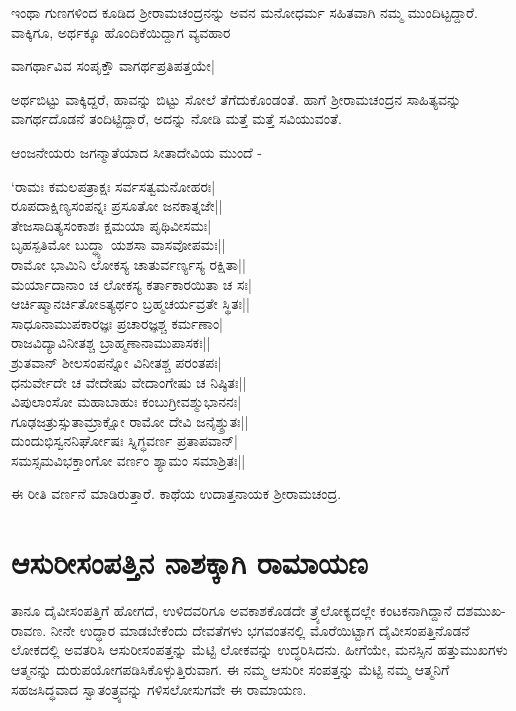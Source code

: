 ಇಂಥಾ ಗುಣಗಳಿಂದ ಕೂಡಿದ ಶ್ರೀರಾಮಚಂದ್ರನನ್ನು ಅವನ ಮನೋಧರ್ಮ ಸಹಿತವಾಗಿ ನಮ್ಮ ಮುಂದಿಟ್ಟದ್ದಾರೆ. ವಾಕ್ಕಿಗೂ, ಅರ್ಥಕ್ಕೂ ಹೊಂದಿಕೆಯಿದ್ದಾಗ ವ್ಯವಹಾರ 

\begin{shloka}
ವಾಗರ್ಥಾವಿವ ಸಂಪೃಕ್ತೌ ವಾಗರ್ಥಪ್ರತಿಪತ್ತಯೇ|\label{223a}
\end{shloka}
ಅರ್ಥಬಿಟ್ಟು ವಾಕ್ಕಿದ್ದರೆ, ಹಾವನ್ನು ಬಿಟ್ಟು ಸೋಲೆ ತೆಗೆದುಕೊಂಡಂತೆ. ಹಾಗೆ ಶ್ರೀರಾಮಚಂದ್ರನ ಸಾಹಿತ್ಯವನ್ನು ವಾಗರ್ಥದೊಡನೆ ತಂದಿಟ್ಟಿದ್ದಾರೆ, ಅದನ್ನು ನೋಡಿ ಮತ್ತೆ ಮತ್ತೆ ಸವಿಯುವಂತೆ.

ಆಂಜನೇಯರು ಜಗನ್ಮಾತೆಯಾದ ಸೀತಾದೇವಿಯ ಮುಂದೆ -

\begin{shloka}
`ರಾಮಃ ಕಮಲಪತ್ರಾಕ್ಷಃ ಸರ್ವಸತ್ವಮನೋಹರಃ|\\
ರೂಪದಾಕ್ಷಿಣ್ಯಸಂಪನ್ನಃ ಪ್ರಸೂತೋ ಜನಕಾತ್ನಜೇ||\\
ತೇಜಸಾದಿತ್ಯಸಂಕಾಶಃ ಕ್ಷಮಯಾ ಪೃಥಿವೀಸಮಃ|\\
ಬೃಹಸ್ಪತಿಮೋ ಬುದ್ಧ್ಯಾ ಯಶಸಾ ವಾಸವೋಪಮಃ||\\
ರಾಮೋ ಭಾಮಿನಿ ಲೋಕಸ್ಯ ಚಾತುರ್ವರ್ಣ್ಯಸ್ಯ ರಕ್ಷಿತಾ||\\
ಮರ್ಯಾದಾನಾಂ ಚ ಲೋಕಸ್ಯ ಕರ್ತಾಕಾರಯಿತಾ ಚ ಸಃ|\\
ಆರ್ಚಿಷ್ಮಾನರ್ಚಿತೋಽತ್ಯರ್ಥಂ ಬ್ರಹ್ಮಚರ್ಯವ್ರತೇ ಸ್ಥಿತಃ||\\
ಸಾಧೂನಾಮುಪಕಾರಜ್ಞಃ ಪ್ರಚಾರಜ್ಞಶ್ಚ ಕರ್ಮಣಾಂ|\\
ರಾಜವಿದ್ಯಾವಿನೀತಶ್ಚ ಬ್ರಾಹ್ಮಣಾನಾಮುಪಾಸಕಃ||\\
ಶ್ರುತವಾನ್ ಶೀಲಸಂಪನ್ನೋ ವಿನೀತಶ್ಚ ಪರಂತಪಃ|\\
ಧನುರ್ವೇದೇ ಚ ವೇದೇಷು ವೇದಾಂಗೇಷು ಚ ನಿಷ್ಠಿತಃ||\\
ವಿಪುಲಾಂಸೋ ಮಹಾಬಾಹುಃ ಕಂಬುಗ್ರೀವಶ್ಮುಭಾನನಃ|\\
ಗೂಢಜತ್ರುಸ್ಸುತಾಮ್ರಾಕ್ಷೋ ರಾಮೋ ದೇವಿ ಜನೈಶ್ಶ್ರುತಃ||\\
ದುಂದುಭಿಸ್ವನನಿರ್ಘೋಷಃ ಸ್ನಿಗ್ಧವರ್ಣ ಪ್ರತಾಪವಾನ್|\\
ಸಮಸ್ಸಮವಿಭಕ್ತಾಂಗೋ ವರ್ಣಂ ಶ್ಯಾಮಂ ಸಮಾಶ್ರಿತಃ||
\end{shloka}
ಈ ರೀತಿ ವರ್ಣನೆ ಮಾಡಿರುತ್ತಾರೆ. ಕಾಥೆಯ ಉದಾತ್ತನಾಯಕ ಶ್ರೀರಾಮಚಂದ್ರ.

\section*{ಆಸುರೀಸಂಪತ್ತಿನ ನಾಶಕ್ಕಾಗಿ ರಾಮಾಯಣ}

ತಾನೂ ದೈವೀಸಂಪತ್ತಿಗೆ ಹೋಗದೆ, ಉಳಿದವರಿಗೂ ಅವಕಾಶಕೊಡದೇ ತ್ರ್ಯೆಲೋಕ್ಯದಲ್ಲೇ ಕಂಟಕನಾಗಿದ್ದಾನೆ ದಶಮುಖ-ರಾವಣ. ನೀನೇ ಉದ್ಧಾರ ಮಾಡಬೇಕೆಂದು ದೇವತೆಗಳು ಭಗವಂತನಲ್ಲಿ ಮೊರೆಯಿಟ್ಟಾಗ ದೈವೀಸಂಪತ್ತಿನೊಡನೆ ಲೋಕದಲ್ಲಿ ಅವತರಿಸಿ ಆಸುರೀಸಂಪತ್ತನ್ನು ಮೆಟ್ಟಿ ಲೋಕವನ್ನು ಉದ್ಧರಿಸಿದನು. ಹೀಗೆಯೇ, ಮನಸ್ಸಿನ ಹತ್ತುಮುಖಗಳು ಆತ್ಮನನ್ನು ದುರುಪಯೋಗಪಡಿಸಿಕೊಳ್ಳುತ್ತಿರುವಾಗ. ಈ ನಮ್ಮ ಆಸುರೀ ಸಂಪತ್ತನ್ನು ಮೆಟ್ಟಿ ನಮ್ಮ ಆತ್ಮನಿಗೆ ಸಹಜಸಿದ್ಧವಾದ ಸ್ವಾತಂತ್ರ್ಯವನ್ನು ಗಳಿಸಲೋಸುಗವೇ ಈ ರಾಮಾಯಣ.

